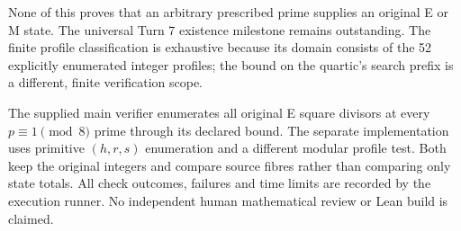 None of this proves that an arbitrary prescribed prime supplies an original E
or M state. The universal Turn 7 existence milestone remains outstanding. The
finite profile classification is exhaustive because its domain consists of the
52 explicitly enumerated integer profiles; the bound on the quartic's search
prefix is a different, finite verification scope.

The supplied main verifier enumerates all original E square divisors at every
$p\equiv1\pmod8$ prime through its declared bound. The separate implementation
uses primitive $(h,r,s)$ enumeration and a different modular profile test. Both
keep the original integers and compare source fibres rather than comparing only
state totals. All check outcomes, failures and time limits are recorded by the
execution runner. No independent human mathematical review or Lean build is claimed.
